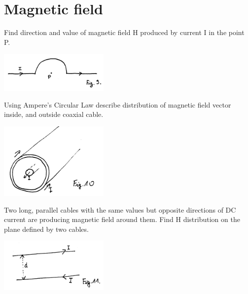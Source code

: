 \section{Magnetic field}

\begin{Exercise}[difficulty=1]
Find direction and value of magnetic field H produced by current I in the point P. 
\begin{center}
\includegraphics[width=0.4\textwidth]{img/fig_m1.png} 
\end{center}
\end{Exercise}

\begin{Exercise}[difficulty=3]
Using Ampere's Circular Law describe distribution of magnetic field vector inside, and outside coaxial cable.
\begin{center}
\includegraphics[width=0.4\textwidth]{img/fig_m2.png} 
\end{center}
\end{Exercise}

\begin{Exercise}[difficulty=2]
Two long, parallel cables with the same values but opposite directions of DC current are producing magnetic field around them. Find H distribution on the plane defined by two cables. 
\begin{center}
\includegraphics[width=0.4\textwidth]{img/fig_m3.png} 
\end{center}
\end{Exercise}
